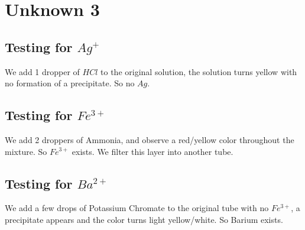 \documentclass[11pt]{article}
\begin{document}
\section{Unknown 3}
\label{sec:orgc92c917}
\subsection{Testing for \(Ag^+\)}
\label{sec:org2cdec9a}
We add 1 dropper of \(HCl\) to the original solution, the solution turns yellow with no formation of a precipitate. So no \(Ag\).
\subsection{Testing for \(Fe^{3+}\)}
\label{sec:orgffcbb72}
We add 2 droppers of Ammonia, and observe a red/yellow color throughout the mixture. So \(Fe^{3+}\) exists. We filter this layer into another tube.
\subsection{Testing for \(Ba^{2+}\)}
\label{sec:orgdc6b925}
We add a few drops of Potassium Chromate to the original tube with no \(Fe^{3+}\), a precipitate appears and the color turns light yellow/white. So Barium exists.
\end{document}
